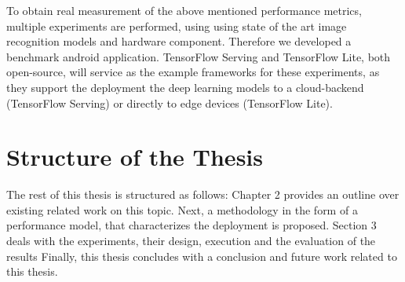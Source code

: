 To obtain real measurement of the above mentioned performance metrics, multiple experiments are performed, using  using state of the art image recognition models and hardware component. Therefore we developed a benchmark android application.
TensorFlow Serving and TensorFlow Lite, both open-source, will service as the example frameworks for these experiments, as they support the deployment the deep learning models to a cloud-backend (TensorFlow Serving) or directly to edge devices (TensorFlow Lite).


\section{Structure of the Thesis}
The rest of this thesis is structured as follows: Chapter 2 provides an outline over existing related work on this topic. Next, a methodology in the form of a performance model, that characterizes the deployment is proposed.
Section 3 deals with the experiments, their design, execution and the evaluation of the results
Finally, this thesis concludes with a conclusion and future work related to this thesis.
\endinput 
